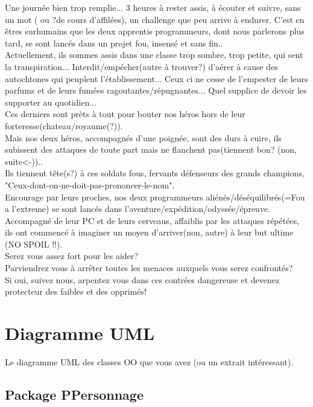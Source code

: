 \documentclass[a4paper,titlepage]{article}
\begin{document}
	Une journée bien trop remplie... 3 heures à rester assis, à écouter et suivre, sans un mot ( ou ?de cours d'affilées), un challenge que peu arrive à endurer. C'est en êtres surhumains que les deux apprentis programmeurs, dont nous parlerons plus tard, se sont lancés dans un projet fou, insensé et sans fin..\\
	
	Actuellement, ils sommes assis dans une classe trop sombre, trop petite, qui sent la transpiration... Interdit/empécher(autre à trouver?) d'aérer à cause des autochtones qui peuplent l'établissement... Ceux ci ne cesse de l'empester de leurs parfums et de leurs fumées ragoutantes/répugnantes... Quel supplice de devoir les supporter au quotidien...\\
	Ces derniers sont prèts à tout pour bouter nos héros hors de leur forteresse(chateau/royaume(?)).\\
	
	Mais nos deux héros, accompagnés d'une poignée, sont des durs à cuire, ils subissent des attaques de toute part mais ne flanchent pas(tiennent bon? (non, suite<-))..\\ 
	Ils tiennent tête(s?) à ces soldats fous, fervants défenseurs des grands champions, "Ceux-dont-on-ne-doit-pas-prononcer-le-nom".\\
	
	Encourage par leurs proches, nos deux programmeurs aliénés/déséquilibrés(=Fou a l'extreme) se sont lancés dans l'aventure/expédition/odyssée/épreuve.\\
	Accompagné de leur PC et de leurs cerveaus, affaiblis par les attaques répétées, ils ont commencé à imaginer un moyen d'arriver(non, autre) à leur but ultime (NO SPOIL !!).\\
	
	Serez vous assez fort pour les aider?\\
	
	Parviendrez vous à arrêter toutes les menaces auxquels vous serez confrontés?\\
	Si oui, suivez nous, arpentez vous dans ces contrées dangereuse et devenez protecteur des faibles et des opprimés!
	
	\clearpage
	\section{Diagramme UML}
	Le diagramme UML des classes OO que vous avez (ou un extrait intéressant).\\
	\subsection{Package PPersonnage}	
	
\end{document}

